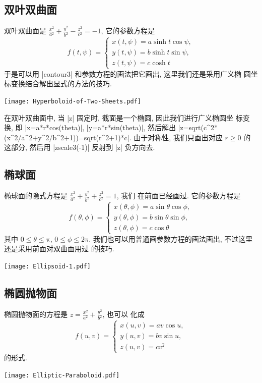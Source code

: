 \documentclass[nofonts,CJKnormalspaces]{ctexbook}[2009/05/20]
\let\leq\leqslant
\let\geq\geqslant
\begin{document}
\subsection{双叶双曲面}
双叶双曲面是
$\frac{x^{2}}{a^{2}}+\frac{y^{2}}{b^{2}}-\frac{z^{2}}{c^{2}}=-1$,
它的参数方程是
\begin{equation}
  f(t,\psi)=\left\{
    \begin{array}{ll}
      x(t,\psi)=a\sinh t\cos\psi,\\
      y(t,\psi)=b\sinh t\sin\psi,\\
      z(t,\psi)=c\cosh t
    \end{array}\right.
\end{equation}
于是可以用 |contour3| 和参数方程的画法把它画出, 这里我们还是采用广义椭
圆坐标变换结合解出显式的方法的技巧.
\begin{center}\texttt{[image: Hyperboloid-of-Two-Sheets.pdf]}\end{center}%

在双叶双曲面中, 当 |z| 固定时, 截面是一个椭圆, 因此我们进行广义椭圆坐
标变换, 即 |x=a*r*cos(theta)|, |y=a*r*sin(theta)|, 然后解出
|z=sqrt(c^2*(x^2/a^2+y^2/b^2+1))=sqrt(r^2+1)*c|. 由于对称性, 我们只画出对应 $r\geq 0$ 的
这部分, 然后用 |zscale3(-1)| 反射到 |z| 负方向去.

\subsection{椭球面}
椭球面的隐式方程是
$\frac{x^{2}}{a^{2}}+\frac{y^{2}}{b^{2}}+\frac{z^{2}}{c^{2}}=1$, 我们
在前面已经画过. 它的参数方程是
\begin{equation}
  f(\theta,\phi)=\left\{
    \begin{array}{ll}
      x(\theta,\phi)=a\sin\theta\cos\phi,\\
      y(\theta,\phi)=b\sin\theta\sin\phi,\\
      z(\theta,\phi)=c\cos\theta
    \end{array}\right.
\end{equation}
其中 $0\leq\theta\leq\mathrm{\pi}$, $0\leq\phi\leq\mathrm{2\pi}$.
我们也可以用普通画参数方程的画法画出, 不过这里还是采用前面对双曲面用过
的技巧.
\begin{center}\texttt{[image: Ellipsoid-1.pdf]}\end{center}%


\subsection{椭圆抛物面}
椭圆抛物面的方程是 $z=\frac{x^{2}}{a^{2}}+\frac{y^{2}}{b^{2}}$, 也可以
化成
\begin{equation}
  f(u,v)=\left\{
    \begin{array}{ll}
      x(u,v)=a v \cos u,\\
      y(u,v)=b v \sin u,\\
      z(u,v)=c v^{2}
    \end{array}\right.
\end{equation}
的形式.
\begin{center}\texttt{[image: Elliptic-Paraboloid.pdf]}\end{center}%

\end{document}
